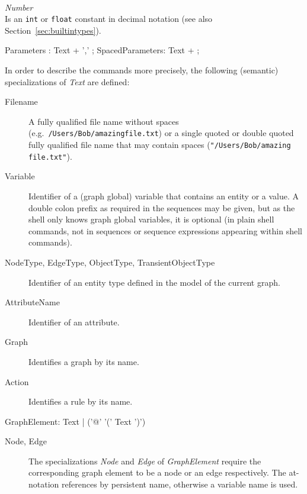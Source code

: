\mbox{ }\\
\emph{Number}\\
Is an \texttt{int} or \texttt{float} constant in decimal notation (see also Section~\ref{sec:builtintypes}).

\begin{rail}
 Parameters : Text + ',' ;
 SpacedParameters: Text + ;
\end{rail}

In order to describe the commands more precisely, the following (semantic) specializations of \emph{Text} are defined:
\begin{description}
  \item[Filename]A fully qualified file name without spaces (e.g.\ \texttt{/Users/Bob/amazing\textunderscore file.txt}) or a single quoted or double quoted fully qualified file name that may contain spaces (\texttt{"/Users/Bob/amazing file.txt"}).
  \item[Variable] Identifier of a (graph global) variable that contains an entity or a value.  A double colon prefix as required in the sequences may be given, but as the shell only knows graph global variables, it is optional (in plain shell commands, not in sequences or sequence expressions appearing within shell commands).
  \item[NodeType, EdgeType, ObjectType, TransientObjectType] Identifier of an entity type defined in the model of the current graph.
  \item[AttributeName] Identifier of an attribute.
  \item[Graph] Identifies a graph by its name.
  \item[Action] Identifies a rule by its name.
\end{description}

\makeatletter
\begin{rail}
  GraphElement: Text | ('@' '(' Text ')')
\end{rail}
\makeatother

\begin{description}
  \item[Node, Edge] The specializations \emph{Node} and \emph{Edge} of \emph{GraphElement} require the corresponding graph element to be a node or an edge respectively. The at-notation references by persistent name, otherwise a variable name is used.
\end{description}

